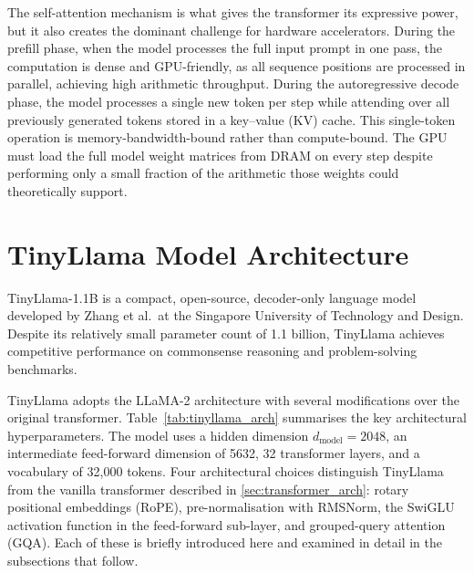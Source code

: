 The self-attention mechanism is what gives the transformer its expressive
power, but it also creates the dominant challenge for hardware accelerators.
During the prefill phase, when the model processes the full input prompt in
one pass, the computation is dense and GPU-friendly, as all sequence positions
are processed in parallel, achieving high arithmetic throughput. During the
autoregressive decode phase, the model processes a single new
token per step while attending over all previously generated tokens stored
in a key--value (KV) cache. This single-token operation is
memory-bandwidth-bound rather than compute-bound. The GPU must load the
full model weight matrices from DRAM on every step despite performing only
a small fraction of the arithmetic those weights could theoretically support.

\section{TinyLlama Model Architecture}
\label{sec:tinyllama_arch}

TinyLlama-1.1B \cite{zhang2024tinyllama} is a compact, open-source, decoder-only
language model developed by Zhang et al.\ at the Singapore University of
Technology and Design.
Despite its relatively small parameter count of 1.1 billion,
TinyLlama achieves competitive performance on commonsense reasoning and
problem-solving benchmarks.

TinyLlama adopts the LLaMA-2 architecture \cite{touvron2023llama2} with several
modifications over the original transformer. Table~\ref{tab:tinyllama_arch}
summarises the key architectural hyperparameters. The model uses a hidden
dimension $d_{\text{model}} = 2048$, an intermediate feed-forward dimension
of 5632, 32 transformer layers, and a vocabulary of 32{,}000 tokens. Four
architectural choices distinguish TinyLlama from the vanilla transformer
described in \cref{sec:transformer_arch}: rotary positional embeddings
(RoPE), pre-normalisation with RMSNorm, the SwiGLU activation function in
the feed-forward sub-layer, and grouped-query attention (GQA). Each of
these is briefly introduced here and examined in detail in the subsections
that follow.

